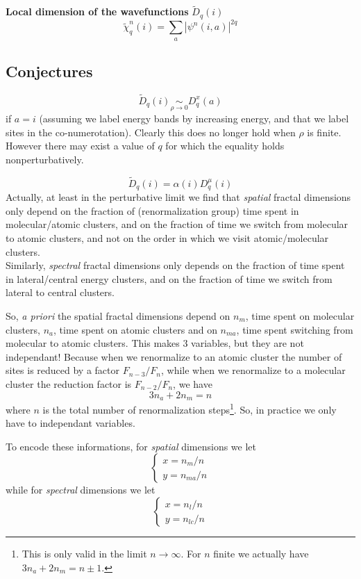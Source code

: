 \documentclass[11pt]{article}
\newcommand{\simlim}[2]{\ensuremath{ \underset{#1 \rightarrow #2}{\sim} }}
\begin{document}
\textbf{Local dimension of the wavefunctions} $\boxed{\tilde D_q(i)}$
\begin{equation}
	\tilde \chi^n_q(i) = \sum_a|\psi^n(i,a)|^{2q}
\end{equation}

\subsection{Conjectures}
\begin{equation}
	\tilde{D}_q(i)  \simlim{\rho}{0} D^x_q(a)
\end{equation}
if $a=i$ (assuming we label energy bands by increasing energy, and that we label sites in the co-numerotation).
Clearly this does no longer hold when $\rho$ is finite.
However there may exist a value of $q$ for which the equality holds nonperturbatively.

\begin{equation}
	\tilde{D}_q(i) = \alpha(i) D^\mu_q(i)
\end{equation}
Actually, at least in the perturbative limit we find that \emph{spatial} fractal dimensions only depend on the fraction of (renormalization group) time spent in molecular/atomic clusters, and on the fraction of time we switch from molecular to atomic clusters, and not on the order in which we visit atomic/molecular clusters. \\
Similarly, \emph{spectral} fractal dimensions only depends on the fraction of time spent in lateral/central energy clusters, and on the fraction of time we switch from lateral to central clusters.

So, \textit{a priori} the spatial fractal dimensions depend on $n_m$, time spent on molecular clusters, $n_a$, time spent on atomic clusters and on $n_{ma}$, time spent switching from molecular to atomic clusters. 
This makes 3 variables, but they are not independant! Because when we renormalize to an atomic cluster the number of sites is reduced by a factor $F_{n-3}/F_n$, while when we renormalize to a molecular cluster the reduction factor is $F_{n-2}/F_n$, we have
\begin{equation}
	3 n_a + 2 n_m = n
\end{equation}
where $n$ is the total number of renormalization steps\footnote{This is only valid in the limit $n \rightarrow \infty$. For $n$ finite we actually have $3 n_a + 2 n_m = n \pm 1$.}.
So, in practice we only have to independant variables.

To encode these informations, for \emph{spatial} dimensions we let
\begin{equation}
	  \begin{cases}
        x = n_m/n \\
        y = n_{ma}/n
      \end{cases}
\end{equation} 
while for \emph{spectral} dimensions we let
\begin{equation}
	  \begin{cases}
        x = n_l/n \\
        y = n_{lc}/n
      \end{cases}
\end{equation} 
\end{document}
